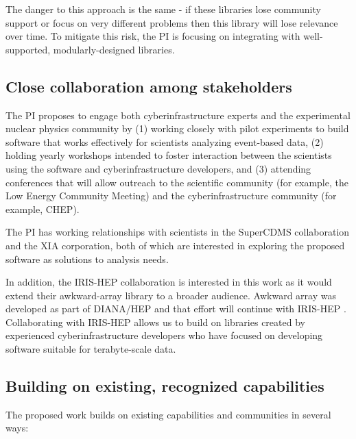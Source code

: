 The danger to this approach is the same - if these libraries lose community support or focus on very different problems then this library will lose relevance over time.  To mitigate this risk, the PI is focusing on integrating with well-supported, modularly-designed libraries.

\subsection{Close collaboration among stakeholders}

The PI proposes to engage both cyberinfrastructure experts and the experimental nuclear physics community by (1) working closely with pilot experiments to build software that works effectively for scientists analyzing event-based data, (2) holding yearly workshops intended to foster interaction between the scientists using the software and cyberinfrastructure developers, and (3) attending conferences that will allow outreach to the scientific community (for example, the Low Energy Community Meeting) and the cyberinfrastructure community (for example, CHEP).

The PI has working relationships with scientists in the SuperCDMS collaboration and the XIA corporation, both of which are interested in exploring the proposed software as solutions to analysis needs.

In addition, the IRIS-HEP collaboration is interested in this work as it would extend their awkward-array library to a broader audience.  Awkward array was developed as part of DIANA/HEP \cite{diana-hep} and that effort will continue with IRIS-HEP \cite{iris-hep}
.  Collaborating with IRIS-HEP allows us to build on libraries created by experienced cyberinfrastructure developers who have focused on developing software suitable for terabyte-scale data.


\subsection{Building on existing, recognized capabilities}

The proposed work builds on existing capabilities and communities in several ways:

